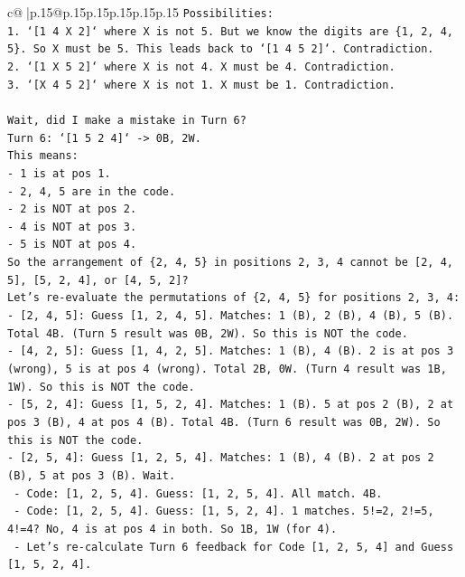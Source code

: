 \documentclass{article}
\begin{document}
{\begin{supertabular}{c@{$\;$}|p{.15\linewidth}@{}p{.15\linewidth}p{.15\linewidth}p{.15\linewidth}p{.15\linewidth}p{.15\linewidth}}
{{{\texttt{Possibilities:} \\
\texttt{1. `{[}1 4 X 2{]}` where X is not 5. But we know the digits are \{1, 2, 4, 5\}. So X must be 5. This leads back to `{[}1 4 5 2{]}`. Contradiction.} \\
\texttt{2. `{[}1 X 5 2{]}` where X is not 4. X must be 4. Contradiction.} \\
\texttt{3. `{[}X 4 5 2{]}` where X is not 1. X must be 1. Contradiction.} \\
\\ 
\texttt{Wait, did I make a mistake in Turn 6?} \\
\texttt{Turn 6: `{[}1 5 2 4{]}` {-}> 0B, 2W.} \\
\texttt{This means:} \\
\texttt{{-} 1 is at pos 1.} \\
\texttt{{-} 2, 4, 5 are in the code.} \\
\texttt{{-} 2 is NOT at pos 2.} \\
\texttt{{-} 4 is NOT at pos 3.} \\
\texttt{{-} 5 is NOT at pos 4.} \\
\texttt{So the arrangement of \{2, 4, 5\} in positions 2, 3, 4 cannot be {[}2, 4, 5{]}, {[}5, 2, 4{]}, or {[}4, 5, 2{]}?} \\
\texttt{Let's re{-}evaluate the permutations of \{2, 4, 5\} for positions 2, 3, 4:} \\
\texttt{{-} {[}2, 4, 5{]}: Guess {[}1, 2, 4, 5{]}. Matches: 1 (B), 2 (B), 4 (B), 5 (B). Total 4B. (Turn 5 result was 0B, 2W). So this is NOT the code.} \\
\texttt{{-} {[}4, 2, 5{]}: Guess {[}1, 4, 2, 5{]}. Matches: 1 (B), 4 (B). 2 is at pos 3 (wrong), 5 is at pos 4 (wrong). Total 2B, 0W. (Turn 4 result was 1B, 1W). So this is NOT the code.} \\
\texttt{{-} {[}5, 2, 4{]}: Guess {[}1, 5, 2, 4{]}. Matches: 1 (B). 5 at pos 2 (B), 2 at pos 3 (B), 4 at pos 4 (B). Total 4B. (Turn 6 result was 0B, 2W). So this is NOT the code.} \\
\texttt{{-} {[}2, 5, 4{]}: Guess {[}1, 2, 5, 4{]}. Matches: 1 (B), 4 (B). 2 at pos 2 (B), 5 at pos 3 (B). Wait.} \\
\texttt{  {-} Code: {[}1, 2, 5, 4{]}. Guess: {[}1, 2, 5, 4{]}. All match. 4B.} \\
\texttt{  {-} Code: {[}1, 2, 5, 4{]}. Guess: {[}1, 5, 2, 4{]}. 1 matches. 5!=2, 2!=5, 4!=4? No, 4 is at pos 4 in both. So 1B, 1W (for 4).} \\
\texttt{  {-} Let's re{-}calculate Turn 6 feedback for Code {[}1, 2, 5, 4{]} and Guess {[}1, 5, 2, 4{]}.} \\
}}}
\end{supertabular}}
\end{document}
